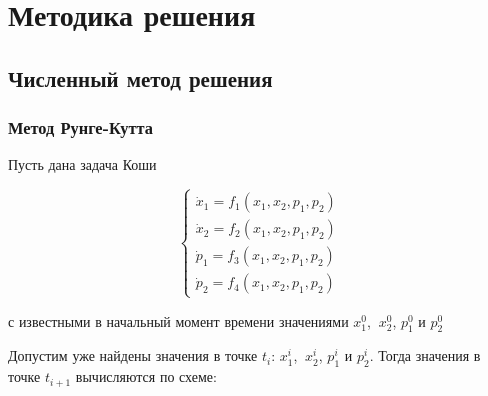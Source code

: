 \documentclass[a4paper,12pt]{article}
\begin{document}
\section{Методика решения}

\subsection{Численный метод решения}

\subsubsection{Метод Рунге-Кутта}

Пусть дана задача Коши

\begin{equation*}
  \begin{cases}
    \dot{x}_1=f_1(x_1,x_2,p_1,p_2) \\
    \dot{x}_2=f_2(x_1,x_2,p_1,p_2) \\
    \dot{p}_1=f_3(x_1,x_2,p_1,p_2) \\
    \dot{p}_2=f_4(x_1,x_2,p_1,p_2)
  \end{cases}
\end{equation*}

с известными в начальный момент времени значениями \(x_1^0\),
\(\ x_2^0\), \(p_1^0\) и \(p_2^0\)

Допустим уже найдены значения в точке \(t_i\): \(x_1^i\), \(\ x_2^i\),
\(p_1^i\) и \(p_2^i\). Тогда значения в точке \(t_{i+1}\) вычисляются по
схеме:
\end{document}

